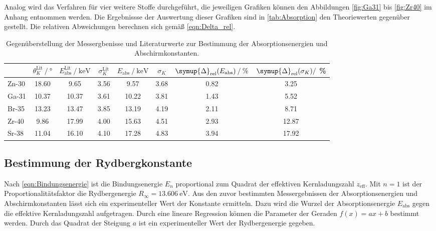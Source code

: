Analog wird das Verfahren für vier weitere Stoffe durchgeführt, die jeweiligen Grafiken können den Abbildungen \ref{fig:Ga31} bis \ref{fig:Zr40} im Anhang 
entnommen werden.  Die Ergebnissse der Auswertung dieser Grafiken sind in \autoref{tab:Absorption} den Theoriewerten gegenüber gestellt.
Die relativen Abweichungen berechnen sich gemäß \autoref{eqn:Delta_rel}.

\begin{table}
  \centering
  \caption{Gegenüberstellung der Messergbenisse und Literaturwerte \cite{NIST} zur Bestimmung der Absorptionsenergien und Abschirmkonstanten.}
  \label{tab:Absorption}
  \begin{tabular}{l S[table-format = 2.2] S S[table-format = 1.2] S[table-format = 2.2] S[table-format = 1.2] S S[table-format = 2.2]}
    \toprule
     {} & {$\theta^\text{Lit}_K \mathbin{/} \unit{\degree}$} & {$E^\text{Lit}_\text{abs} \mathbin{/} \unit{\kilo\electronvolt}$} &%
     {$\sigma^\text{Lit}_K$} & {$E_\text{abs} \mathbin{/} \unit{\kilo\electronvolt}$} & {$\sigma_K$} & {$\symup{\Delta}_\text{rel}(E_\text{abs}) \mathbin{/} \%$} &%
     {$\symup{\Delta}_\text{rel}(\sigma_K) \mathbin{/}$ \%}\\
    \midrule
      {Zn-30}      & 18.60 &  9.65 & 3.56 &  9.57 & 3.68 & 0.82 &  3.25 \\ 
      {Ga-31}   & 10.37 & 10.37 & 3.61 & 10.22 & 3.81 & 1.43 &  5.52 \\
      {Br-35}      & 13.23 & 13.47 & 3.85 & 13.19 & 4.19 & 2.11 &  8.71 \\
      {Zr-40} &  9.86 & 17.99 & 4.00 & 15.63 & 4.51 & 2.93 & 12.87 \\
      {Sr-38} & 11.04 & 16.10 & 4.10 & 17.28 & 4.83 & 3.94 & 17.92 \\
    \bottomrule
  \end{tabular}
\end{table}

\subsection{Bestimmung der Rydbergkonstante}
\label{subsec:Rydberg}
Nach \autoref{eqn:Bindungsenergie} ist die Bindungsenergie $E_n$ proportional zum Quadrat der effektiven Kernladungszahl $z_\text{eff}$. Mit $n = 1$ ist der 
Proportionalitätsfaktor die Rydbergenergie $R_\infty = \qty{13.606}{\electronvolt}$. Aus den zuvor bestimmten Messergebnissen der Absorptionsenergien und 
Abschirmkonstanten lässt sich ein experimenteller Wert der Konstante ermitteln. Dazu wird die Wurzel der Absorptionsenergie $E_\text{abs}$ gegen die effektive
Kernladungszahl aufgetragen. Durch eine lineare Regression können die Parameter der Geraden $f(x) = ax + b$ bestimmt werden. Durch das Quadrat der Steigung $a$ 
ist ein experimenteller Wert der Rydbergenergie gegeben.

